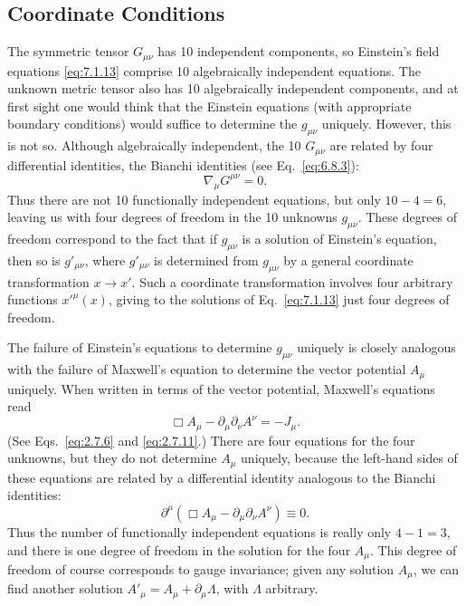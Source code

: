 
\subsection{Coordinate Conditions}\label{sec:7.4}

The symmetric tensor \(G_{\mu\nu}\) has 10 independent components, so
Einstein's field equations \eqref{eq:7.1.13} comprise 10 algebraically
independent equations. The unknown metric tensor also has 10 algebraically
independent components, and at first sight one would think that the Einstein
equations (with appropriate boundary conditions) would suffice to determine
the \(g_{\mu\nu}\) uniquely. However, this is not so. Although algebraically
independent, the 10 \(G_{\mu\nu}\) are related by four differential
identities, the Bianchi identities (see Eq.~\eqref{eq:6.8.3}):
\[
  \nabla_\mu G^{\mu\nu}=0.
\]
Thus there are not 10 functionally independent equations, but only
\(10-4=6\), leaving us with four degrees of freedom in the 10 unknowns
\(g_{\mu\nu}\). These degrees of freedom correspond to the fact that if
\(g_{\mu\nu}\) is a solution of Einstein's equation, then so is
\(g'_{\mu\nu}\), where \(g'_{\mu\nu}\) is determined from \(g_{\mu\nu}\) by
a general coordinate transformation \(x\to x'\). Such a coordinate
transformation involves four arbitrary functions \(x'^\mu(x)\), giving to
the solutions of Eq.~\eqref{eq:7.1.13} just four degrees of freedom.

The failure of Einstein's equations to determine \(g_{\mu\nu}\) uniquely is
closely analogous with the failure of Maxwell's equation to determine the
vector potential \(A_\mu\) uniquely. When written in terms of the vector
potential, Maxwell's equations read
\begin{equation}
  \Box A_\mu-\partial_\mu\partial_\nu A^\nu=-J_\mu.
  \tag{7.4.1}\label{eq:7.4.1}
\end{equation}
(See Eqs.~\eqref{eq:2.7.6} and \eqref{eq:2.7.11}.) There are four equations
for the four unknowns, but they do not determine \(A_\mu\) uniquely, because
the left-hand sides of these equations are related by a differential identity
analogous to the Bianchi identities:
\[
  \partial^\mu
  \left(
    \Box A_\mu-\partial_\mu\partial_\nu A^\nu
  \right)
  \equiv0.
\]
Thus the number of functionally independent equations is really only
\(4-1=3\), and there is one degree of freedom in the solution for the four
\(A_\mu\). This degree of freedom of course corresponds to gauge invariance;
given any solution \(A_\mu\), we can find another solution
\(A'_\mu=A_\mu+\partial_\mu\Lambda\), with \(\Lambda\) arbitrary.

